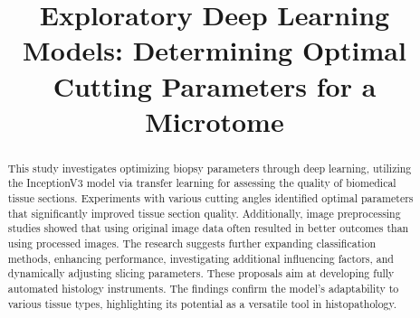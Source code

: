 \documentclass[withoutpreface,bwprint]{cumcmthesis}
\title{Exploratory Deep Learning Models: Determining Optimal Cutting Parameters for a Microtome}
\begin{document}
 \maketitle
\renewcommand{\abstractname}{Abstract}
\renewcommand{\keywords}{\textbf{Keywords：}}
\begin{abstract}
\begin{spacing}{1.15}

	This study investigates optimizing biopsy parameters through deep learning, utilizing the InceptionV3 model via transfer learning for assessing the quality of biomedical tissue sections. Experiments with various cutting angles identified optimal parameters that significantly improved tissue section quality. Additionally, image preprocessing studies showed that using original image data often resulted in better outcomes than using processed images.
    The research suggests further expanding classification methods, enhancing performance, investigating additional influencing factors, and dynamically adjusting slicing parameters. These proposals aim at developing fully automated histology instruments. The findings confirm the model's adaptability to various tissue types, highlighting its potential as a versatile tool in histopathology.



\end{spacing}
\large

\end{abstract}




\newpage
{
	\tableofcontents
}
\newpage


%
% 
% 
%  
% 
% 
% 
\end{document}
